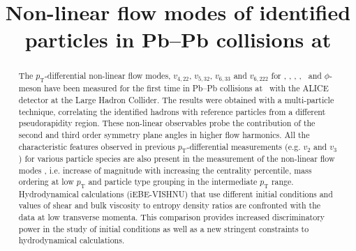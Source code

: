 \documentclass[ALICE,manyauthors]{cernphprep}
\begin{document}


\begin{titlepage}

\title{Non-linear flow modes of identified particles in Pb--Pb collisions at \sNN}


\begin{abstract}
\noindent The $p_{\mathrm{T}}$-differential non-linear flow modes, $v_{4,22}$, $v_{5,32}$, $v_{6,33}$ and $v_{6,222}$ for \pion, \kaon, \proton, \Ks, \lambdas~and $\phi$-meson have been measured for the first time in Pb--Pb collisions at \sNN~with the ALICE detector at the Large Hadron Collider. The results were obtained with a multi-particle technique, correlating the identified hadrons with reference particles from a different pseudorapidity region. %
These non-linear observables probe the contribution of the second and third order symmetry plane angles in higher flow harmonics. All the characteristic features observed in previous $p_{\mathrm{T}}$-differential measurements (e.g. $v_{2}$ and $v_{3}$) for various particle species are also present in the measurement of the non-linear flow modes , i.e. increase of magnitude with increasing the centrality percentile, mass ordering at low $p_{\mathrm{T}}$ and particle type grouping in the intermediate $p_{\mathrm{T}}$ range. Hydrodynamical calculations (iEBE-VISHNU) that use different initial conditions and values of shear and bulk viscosity to entropy density ratios are confronted with the data at low transverse momenta. This comparison provides increased discriminatory power in the study of initial conditions as well as a new stringent constraints to hydrodynamical calculations.


\end{abstract}
\end{titlepage}
\end{document}

